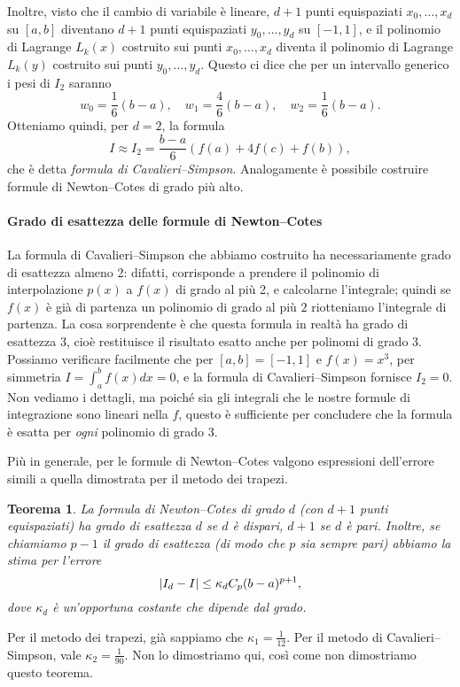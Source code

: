 \documentclass[a4paper]{report}
\DeclarePairedDelimiter{\abs}{\lvert}{\rvert}
\newtheorem{theorem}{Teorema}[chapter]
\theoremstyle{definiton}
\theoremstyle{remark}
\begin{document}
Inoltre, visto che il cambio di variabile è lineare, $d+1$ punti equispaziati $x_0,\dots,x_d$ su $[a,b]$ diventano $d+1$ punti equispaziati $y_0,\dots,y_d$ su $[-1,1]$, e il polinomio di Lagrange $L_k(x)$ costruito sui punti $x_0,\dots,x_d$ diventa il polinomio di Lagrange $L_k(y)$ costruito sui punti $y_0,\dots,y_d$. Questo ci dice che per un intervallo generico i pesi di $I_2$ saranno
\[
w_0 = \frac16(b-a), \quad w_1 = \frac46 (b-a), \quad w_2 = \frac16 (b-a).
\]
Otteniamo quindi, per $d=2$, la formula
\[
I \approx I_2 = \frac{b-a}{6}\left(f(a) + 4f(c) + f(b)\right),
\]
che è detta \emph{formula di Cavalieri--Simpson}. Analogamente è possibile costruire formule di Newton--Cotes di grado più alto.

\paragraph{Grado di esattezza delle formule di Newton--Cotes}

La formula di Cavalieri--Simpson che abbiamo costruito ha necessariamente grado di esattezza almeno 2: difatti, corrisponde a prendere il polinomio di interpolazione $p(x)$ a $f(x)$ di grado al più 2, e calcolarne l'integrale; quindi se $f(x)$ è già di partenza un polinomio di grado al più $2$ riotteniamo l'integrale di partenza. La cosa sorprendente è che questa formula in realtà ha grado di esattezza 3, cioè restituisce il risultato esatto anche per polinomi di grado $3$. Possiamo verificare facilmente che per $[a,b]=[-1,1]$ e $f(x)=x^3$, per simmetria $I = \int_{a}^b f(x) dx = 0$, e la  formula di Cavalieri--Simpson fornisce $I_2=0$. Non vediamo i dettagli, ma poiché sia gli integrali che le nostre formule di integrazione sono lineari nella $f$, questo è sufficiente per concludere che la formula è esatta per \emph{ogni} polinomio di grado 3.

Più in generale, per le formule di Newton--Cotes valgono espressioni dell'errore simili a quella dimostrata per il metodo dei trapezi.
\begin{theorem}
La formula di Newton--Cotes di grado $d$ (con $d+1$ punti equispaziati) ha grado di esattezza $d$ se $d$ è dispari, $d+1$ se $d$ è pari.
Inoltre, se chiamiamo $p-1$ il grado di esattezza (di modo che $p$ sia sempre pari) abbiamo la stima per l'errore
\[
\abs{I_d - I} \leq \kappa_d C_{p} (b-a)^{p+1},
\]
dove $\kappa_d$ è un'opportuna costante che dipende dal grado.
\end{theorem}
Per il metodo dei trapezi, già sappiamo che $\kappa_1 = \frac{1}{12}$. Per il metodo di Cavalieri--Simpson, vale $\kappa_2 = \frac{1}{90}$. Non lo dimostriamo qui, così come non dimostriamo questo teorema.
\end{document}
